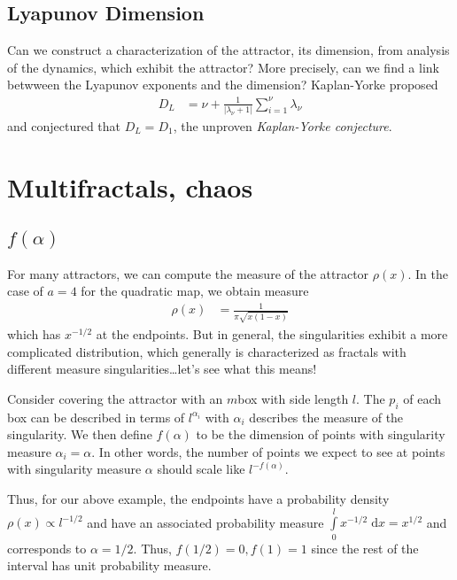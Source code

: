 \documentclass[10pt]{article}
\newcommand{\abs}[1]{\left|#1\right|}
\begin{document}
\subsection{Lyapunov Dimension}

Can we construct a characterization of the attractor, its dimension, from
analysis of the dynamics, which exhibit the attractor? More precisely, can we
find a link betwween the Lyapunov exponents and the dimension? Kaplan-Yorke
proposed
\begin{align}
    D_L &= \nu + \frac{1}{\abs{\lambda_\nu + 1}}
    \sum\limits_{i=1}^{\nu}\lambda_\nu
\end{align}
and conjectured that $D_L = D_1$, the unproven \emph{Kaplan-Yorke conjecture}.

\clearpage

\section{Multifractals, chaos}

\subsection{$f(\alpha)$}

For many attractors, we can compute the measure of the attractor $\rho(x)$. In
the case of $a=4$ for the quadratic map, we obtain measure
\begin{align}
    \rho(x) &= \frac{1}{\pi\sqrt{x(1-x)}}
\end{align}
which has $x^{-1/2}$ at the endpoints. But in general, the singularities exhibit
a more complicated distribution, which generally is characterized as fractals
with different measure singularities\dots let's see what this means!

Consider covering the attractor with an $m$box with side length $l$. The
$p_i$ of each box can be described in terms of $l^{\alpha_i}$ with $\alpha_i$
describes the measure of the singularity. We then define $f(\alpha)$ to be the
dimension of points with singularity measure $\alpha_i = \alpha$. In other
words, the number of points we expect to see at points with singularity measure
$\alpha$ should scale like $l^{-f(\alpha)}$.

Thus, for our above example, the endpoints have a probability density $\rho(x)
\propto l^{-1/2}$ and have an associated probability measure
$\int\limits_{0}^{l}x^{ -1/2}\;\mathrm{d}x=x^{1/2}$ and corresponds to $\alpha =
1/2$. Thus, $f(1/2) = 0, f(1) = 1$ since the rest of the interval has unit
probability measure.
\end{document}
